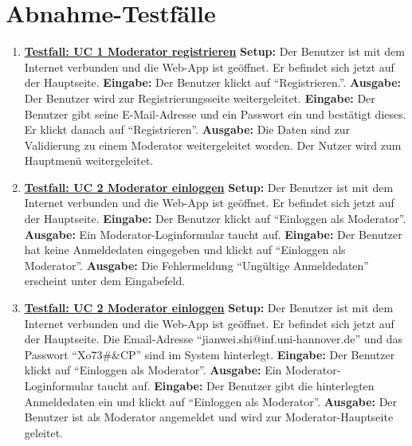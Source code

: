 \section{Abnahme-Testfälle}
\begin{enumerate}
	\item \underline{\textbf{Testfall: UC 1 Moderator registrieren}} \linebreak
	\textbf{Setup:} Der Benutzer ist mit dem Internet verbunden und die Web-App ist geöffnet. Er befindet sich jetzt auf der Hauptseite.\linebreak
	\textbf{Eingabe:} Der Benutzer klickt auf ``Registrieren.''.\linebreak
	\textbf{Ausgabe:} Der Benutzer wird zur Registrierungsseite weitergeleitet.\linebreak
	\textbf{Eingabe:} Der Benutzer gibt seine E-Mail-Adresse und ein Passwort ein und bestätigt dieses. Er klickt danach auf ``Registrieren''. \linebreak
	\textbf{Ausgabe:} Die Daten sind zur Validierung zu einem Moderator weitergeleitet worden. Der Nutzer wird zum Hauptmenü weitergeleitet.
	
	\item \underline{\textbf{Testfall: UC 2 Moderator einloggen}} \linebreak
	\textbf{Setup:} Der Benutzer ist mit dem Internet verbunden und die Web-App ist geöffnet. Er befindet sich jetzt auf der Hauptseite. \linebreak
	\textbf{Eingabe:} Der Benutzer klickt auf ``Einloggen als Moderator''. \linebreak
	\textbf{Ausgabe:} Ein Moderator-Loginformular taucht auf.\linebreak
	\textbf{Eingabe:} Der Benutzer hat keine Anmeldedaten eingegeben und klickt auf ``Einloggen als Moderator''.\linebreak
	\textbf{Ausgabe:} Die Fehlermeldung ``Ungültige Anmeldedaten'' erscheint unter dem Eingabefeld.
	
	\item \underline{\textbf{Testfall: UC 2 Moderator einloggen}} \linebreak
	\textbf{Setup:} Der Benutzer ist mit dem Internet verbunden und die Web-App ist geöffnet. Er befindet sich jetzt auf der Hauptseite. Die Email-Adresse ``jianwei.shi@inf.uni-hannover.de'' und das Passwort ``Xo73\#\&CP'' sind im System hinterlegt. \linebreak
	\textbf{Eingabe:} Der Benutzer klickt auf ``Einloggen als Moderator''. \linebreak
	\textbf{Ausgabe:} Ein Moderator-Loginformular taucht auf.\linebreak
	\textbf{Eingabe:} Der Benutzer gibt die hinterlegten Anmeldedaten ein und klickt auf ``Einloggen als Moderator''.\linebreak
	\textbf{Ausgabe:} Der Benutzer ist als Moderator angemeldet und wird zur Moderator-Hauptseite geleitet.
	

\end{enumerate}
